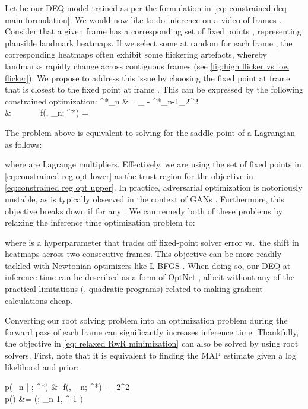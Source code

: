 \documentclass[10pt,twocolumn,letterpaper]{article}
\newcommand\norm[1]{\left\lVert#1\right\rVert}
\def\vtheta{{\bm{\theta}}}
\def\vx{{\bm{x}}}
\def\vz{{\bm{z}}}
\DeclareMathOperator*{\argmin}{arg\,min}
\begin{document}
Let  be our DEQ model trained as per the formulation in \cref{eq: constrained deq main formulation}. We would now like to do inference on a video of  frames . Consider that a given frame  has a corresponding set of fixed points , representing plausible landmark heatmaps. If we select some  at random for each frame , the corresponding heatmaps  often exhibit some flickering artefacts, whereby landmarks rapidly change across contiguous frames (see \cref{fig:high flicker vs low flicker}). We propose to address this issue by choosing the fixed point at frame  that is closest to the fixed point at frame . This can be expressed by the following constrained optimization:
\vz^*_n &= \argmin_{\vz} \norm{\vz - \vz^*_{n-1}}_2^2 \label{eq:constrained reg opt upper} \\
& ~~~  ~~ f(\vz, \vx_n; \vtheta^*) = \vz \label{eq:constrained reg opt lower}

The problem above is equivalent to solving for the saddle point of a Lagrangian as follows:

where  are Lagrange multipliers. Effectively, we are using the set of fixed points  in \cref{eq:constrained reg opt lower} as the trust region for the objective in \cref{eq:constrained reg opt upper}. In practice, adversarial optimization is notoriously unstable, as is typically observed in the context of GANs \cite{Goodfellow2014GAN, Arjovsky2014WassersteinGANs, Srivastava2017VeeGAN}. Furthermore, this objective breaks down if  for any . We can remedy both of these problems by relaxing the inference time optimization problem to:

where  is a hyperparameter that trades off fixed-point solver error vs.\ the shift in heatmaps across two consecutive frames. This objective can be more readily tackled with Newtonian optimizers like L-BFGS \cite{Liu1989LBFGS}. When doing so, our DEQ at inference time can be described as a form of OptNet \cite{Amos2017Optnet}, albeit without any of the practical limitations (\eg, quadratic programs) related to making gradient calculations cheap. 

Converting our root solving problem into an optimization problem during the forward pass of each frame can significantly increases inference time. Thankfully, the objective in \cref{eq: relaxed RwR minimization} can also be solved by using root solvers. First, note that it is equivalent to finding the MAP estimate given a log likelihood and prior: 

\log p(\vx_n | \vz; \vtheta^*) &\propto - \norm{f(\vz, \vx_n; \vtheta^*) - \vz}_2^2 \label{eq:likelihood} \\
p(\vz) &= (\vz; \vz_{n-1}, \alpha^{-1} ) \label{eq:prior}
\end{document}
